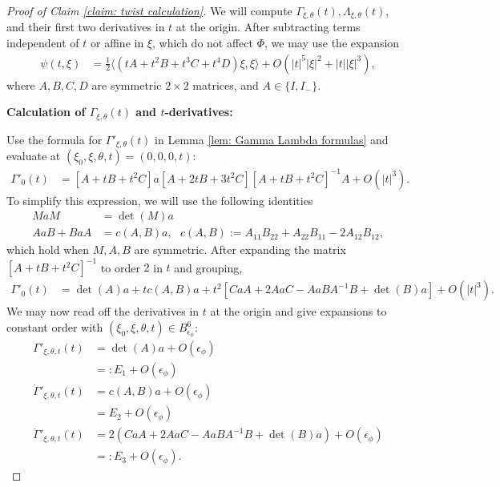\documentclass[10pt,a4paper]{amsart}
\newcommand{\Bphi}{B_{\epsilon_\phi}}
\begin{document}
\begin{proof}[Proof of Claim \ref{claim: twist calculation}]
    We will compute $\Gamma_{\xi,\theta}(t), \Lambda_{\xi,\theta}(t)$, and their first two derivatives in $t$ at the origin. After subtracting terms independent of $t$ or affine in $\xi$, which do not affect $\Phi$, we may use the expansion
    \begin{align}
        \psi(t,\xi) &= \frac{1}{2} \langle (tA + t^2 B + t^3 C + t^4 D) \xi, \xi \rangle + O(|t|^5 |\xi|^2 + |t| |\xi|^3),
    \end{align}
    where $A,B,C,D$ are symmetric $2 \times 2$ matrices, and $A \in \{I, I_-\}$. 

    \medskip
    
    \noindent \textbf{Calculation of $\Gamma_{\xi,\theta}(t)$ and $t$-derivatives:}
    
    Use the formula for $\Gamma'_{\xi,\theta}(t)$ in Lemma \ref{lem: Gamma Lambda formulas} and evaluate at $(\xi_0,\xi,\theta,t) = (0,0,0,t)$:
    \begin{align}
        \Gamma'_0(t) &= [A  + tB + t^2 C]a[A + 2tB + 3t^2 C][A + tB + t^2C]^{-1} A + O(|t|^3). 
    \end{align}
    To simplify this expression, we will use the following identities
    \begin{align}
        M a M &= \det(M)a \\
        AaB + BaA &= c(A,B)a, \text{ $c(A,B) := A_{11}B_{22} + A_{22} B_{11} - 2A_{12} B_{12}$},
    \end{align}
    which hold when $M,A,B$ are symmetric. After expanding the matrix $[A+tB+t^2C]^{-1}$ to order $2$ in $t$ and grouping,
    \begin{align}
        \Gamma'_0(t) &= \det(A)a + tc(A,B)a + t^2[CaA + 2AaC - AaBA^{-1} B + \det(B)a] + O(|t|^3). 
    \end{align}
    We may now read off the derivatives in $t$ at the origin and give expansions to constant order with $(\xi_0,\xi,\theta,t) \in \Bphi^6$: 
    \begin{align}
        \Gamma'_{\xi,\theta,t}(t) &= \det(A) a + O(\epsilon_\phi) \\
        &=: E_1 + O(\epsilon_\phi) \\
        \dot \Gamma'_{\xi,\theta,t}(t) &= c(A,B) a + O(\epsilon_\phi)\\
        &= E_2 + O(\epsilon_\phi)\\
        \ddot \Gamma'_{\xi,\theta,t}(t) &= 2(CaA + 2AaC - AaBA^{-1}B + \det(B)a) + O(\epsilon_\phi) \\
        &=: E_3 + O(\epsilon_\phi). 
    \end{align}


\end{proof}
\end{document}
